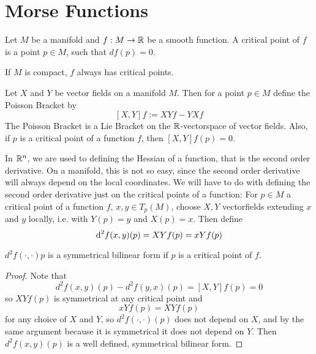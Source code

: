 \section{Morse Functions}

\begin{definition}
    Let $M$ be a manifold and $f: M \to { \mathbb R }$ be a smooth function. A critical point of
    $f$ is a point $p \in M$, such that $df(p) = 0$.
\end{definition}

\begin{remark}
    If $M$ is compact, $f$ always has critical points.
\end{remark}

\begin{definition}
    Let $X$ and $Y$ be vector fields on a manifold $M$. Then for a point $p \in M$ define
    the Poisson Bracket by
    \[  [X, Y]f := XYf - YXf \]
    The Poisson Bracket is a Lie Bracket on the ${ \mathbb R }$-vectorspace of vector fields.
    Also, if $p$ is a critical point of a function $f$, then $[X, Y]f (p) = 0$.
\end{definition}

\begin{definition}[Hessian]
    In ${ \mathbb R }^n$, we are used to defining the Hessian of a function, that is the second order
    derivative. On a manifold, this is not so easy, since the second order derivative will 
    always depend on the local coordinates. We will have to do with defining 
    the second order derivative just on the critical points of a function:
    For $p \in M$ a critical point of a function $f$, $x, y \in T_p(M)$, choose $X, Y$
    vectorfields extending $x$ and $y$ locally, i.e. with $Y(p) = y$ and $X(p) = x$. 
    Then define
    \[ { \operatorname{d} }^2 f (x, y) (p) = XYf (p) = xYf(p)\]
\end{definition}

\begin{lemma}
    $d^2 f (\cdot, \cdot) p$ is a symmetrical bilinear form if $p$ is a critical point of
    $f$.
\end{lemma}

\begin{proof}
    Note that
    \[ d^2 f (x, y) (p) - d^2 f (y, x) (p) = [X, Y]f (p) = 0  \]
    so $XYf(p)$ is symmetrical at any critical point and
    \[ xYf (p) = XYf (p) \]
    for any choice of $X$ and $Y$, so $d^2 f(\cdot, \cdot) (p)$ does not depend
    on $X$, and by the same argument because it is symmetrical it does not depend on $Y$.
    Then $d^2 f (x, y) (p)$ is a well defined, symmetrical bilinear form.
\end{proof}

